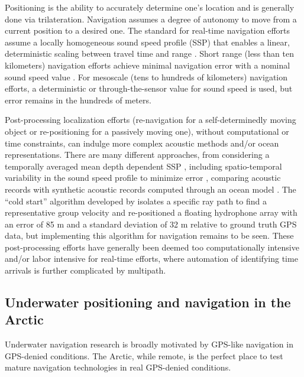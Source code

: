 Positioning is the ability to accurately determine one's location and is generally done via trilateration.
Navigation assumes a degree of autonomy to move from a current position to a desired one.
The standard for real-time navigation efforts assume a locally homogeneous sound speed profile (SSP) that enables a linear, deterministic scaling between travel time and range \citep{eustice_recent_2006,eustice_experimental_2007,webster_preliminary_2009,webster_advances_2012}.
Short range (less than ten kilometers) navigation efforts achieve minimal navigation error with a nominal sound speed value \citep{eustice_experimental_2007,webster_preliminary_2009,kepper_mems_2017}.
For mesoscale (tens to hundreds of kilometers) navigation efforts, a deterministic \citep{graupe_preliminary_2019} or through-the-sensor \citep{webster_towards_2015} value for sound speed is used, but error remains in the hundreds of meters.

Post-processing localization efforts (re-navigation for a self-determinedly moving object or re-positioning for a passively moving one), without computational or time constraints, can indulge more complex acoustic methods and/or ocean representations.
There are many different approaches, from considering a temporally averaged mean depth dependent SSP \citep{van_uffelen_localization_2016}, including spatio-temporal variability in the sound speed profile to minimize error \citep{graupe_preliminary_2019, mikhalevsky_deep_2020}, comparing acoustic records with synthetic acoustic records computed through an ocean model \citep{wu_deep_2019}. 
The ``cold start'' algorithm developed by \citet{mikhalevsky_deep_2020} isolates a specific ray path to find a representative group velocity and re-positioned a floating hydrophone array with an error of 85 m and a standard deviation of 32 m relative to ground truth GPS data, but implementing this algorithm for navigation remains to be seen.
These post-processing efforts have generally been deemed too computationally intensive and/or labor intensive for real-time efforts, where automation of identifying time arrivals is further complicated by multipath. 

\subsection{Underwater positioning and navigation in the Arctic}

Underwater navigation research is broadly motivated by GPS-like navigation in GPS-denied conditions.
The Arctic, while remote, is the perfect place to test mature navigation technologies in real GPS-denied conditions.

